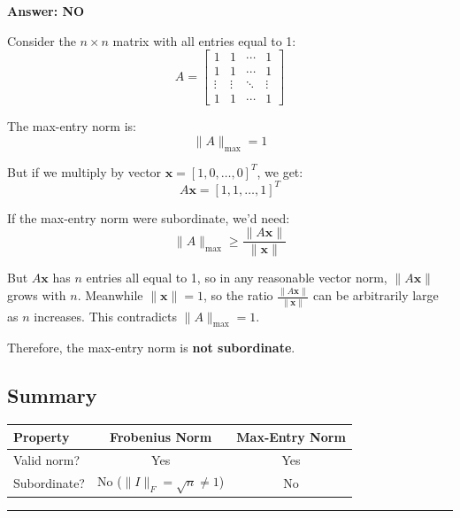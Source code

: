 \textbf{Answer: NO}

Consider the $n \times n$ matrix with all entries equal to 1:
$$A = \begin{bmatrix} 1 & 1 & \cdots & 1 \\ 1 & 1 & \cdots & 1 \\ \vdots & \vdots & \ddots & \vdots \\ 1 & 1 & \cdots & 1 \end{bmatrix}$$

The max-entry norm is:
$$\|A\|_{\max} = 1$$

But if we multiply by vector $\mathbf{x} = [1, 0, \ldots, 0]^T$, we get:
$$A\mathbf{x} = [1, 1, \ldots, 1]^T$$

If the max-entry norm were subordinate, we'd need:
$$\|A\|_{\max} \geq \frac{\|A\mathbf{x}\|}{\|\mathbf{x}\|}$$

But $A\mathbf{x}$ has $n$ entries all equal to 1, so in any reasonable vector norm, $\|A\mathbf{x}\|$ grows with $n$. Meanwhile $\|\mathbf{x}\| = 1$, so the ratio $\frac{\|A\mathbf{x}\|}{\|\mathbf{x}\|}$ can be arbitrarily large as $n$ increases. This contradicts $\|A\|_{\max} = 1$.

Therefore, the max-entry norm is \textbf{not subordinate}. 

\subsection*{Summary}

\begin{center}
\begin{tabular}{lcc}
\toprule
\textbf{Property} & \textbf{Frobenius Norm} & \textbf{Max-Entry Norm} \\
\midrule
Valid norm? & Yes & Yes \\
Subordinate? & No ($\|I\|_F = \sqrt{n} \neq 1$) & No \\
\bottomrule
\end{tabular}
\end{center}

\vspace{2em}
\noindent\rule{\textwidth}{0.4pt}

